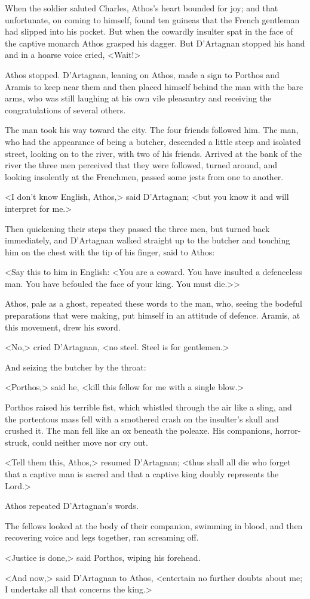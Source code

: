 When the soldier saluted Charles, Athos's heart bounded for joy; and that unfortunate, on coming to himself, found ten guineas that the French gentleman had slipped into his pocket. But when the cowardly insulter spat in the face of the captive monarch Athos grasped his dagger. But D'Artagnan stopped his hand and in a hoarse voice cried, <Wait!>

Athos stopped. D'Artagnan, leaning on Athos, made a sign to Porthos and Aramis to keep near them and then placed himself behind the man with the bare arms, who was still laughing at his own vile pleasantry and receiving the congratulations of several others.

The man took his way toward the city. The four friends followed him. The man, who had the appearance of being a butcher, descended a little steep and isolated street, looking on to the river, with two of his friends. Arrived at the bank of the river the three men perceived that they were followed, turned around, and looking insolently at the Frenchmen, passed some jests from one to another.

<I don't know English, Athos,> said D'Artagnan; <but you know it and will interpret for me.>

Then quickening their steps they passed the three men, but turned back immediately, and D'Artagnan walked straight up to the butcher and touching him on the chest with the tip of his finger, said to Athos:

<Say this to him in English: <You are a coward. You have insulted a defenceless man. You have befouled the face of your king. You must die.>>

Athos, pale as a ghost, repeated these words to the man, who, seeing the bodeful preparations that were making, put himself in an attitude of defence. Aramis, at this movement, drew his sword.

<No,> cried D'Artagnan, <no steel. Steel is for gentlemen.>

And seizing the butcher by the throat:

<Porthos,> said he, <kill this fellow for me with a single blow.>

Porthos raised his terrible fist, which whistled through the air like a sling, and the portentous mass fell with a smothered crash on the insulter's skull and crushed it. The man fell like an ox beneath the poleaxe. His companions, horror-struck, could neither move nor cry out.

<Tell them this, Athos,> resumed D'Artagnan; <thus shall all die who forget that a captive man is sacred and that a captive king doubly represents the Lord.>

Athos repeated D'Artagnan's words.

The fellows looked at the body of their companion, swimming in blood, and then recovering voice and legs together, ran screaming off.

<Justice is done,> said Porthos, wiping his forehead.

<And now,> said D'Artagnan to Athos, <entertain no further doubts about me; I undertake all that concerns the king.> 